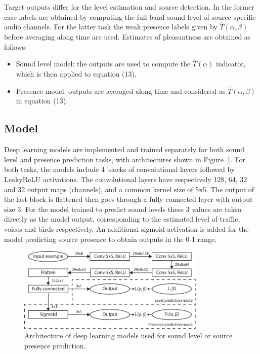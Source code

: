 \documentclass[11pt,a4paper]{article}
\begin{document}
Target outputs differ for the level estimation and source detection. In the former case labels are obtained by computing the full-band sound level of source-specific audio channels. For the latter task the weak presence labels given by $\hat T(\alpha, \beta)$ before averaging along time are used. Estimates of pleasantness are obtained as follows:
\begin{itemize}
\item Sound level model: the outputs are used to compute the $\hat T(\alpha)$ indicator, which is then applied to equation (13),
\item Presence model: outputs are averaged along time and considered as $\hat T(\alpha, \beta)$ in equation (13).
\end{itemize}

\subsection{Model}
\label{sec:pred_mdl}

Deep learning models are implemented and trained separately for both sound level and presence prediction tasks, with architectures shown in Figure~\ref{fig:deep_arch}. For both tasks, the models include 4 blocks of convolutional layers followed by LeakyReLU activations. The convolutional layers have respectively 128, 64, 32 and 32 output maps (channels), and a common kernel size of 5x5. The output of the last block is flattened then goes through a fully connected layer with output size 3. For the model trained to predict sound levels these 3 values are taken directly as the model output, corresponding to the estimated level of traffic, voices and birds respectively. An additional sigmoid activation is added for the model predicting source presence to obtain outputs in the 0-1 range.

\begin{figure}[!h]
    \centering
    \includegraphics[width=0.8\textwidth]{figures/deep_arch.pdf}
    \caption{Architecture of deep learning models used for sound level or source presence prediction.}\label{fig:deep_arch}
\end{figure}
\end{document}

